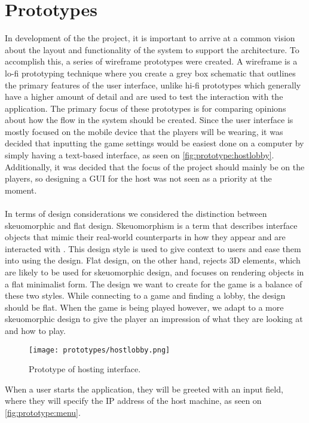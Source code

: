 \section{Prototypes}\label{sec:sprint1-prototypes}
In development of the the project, it is important to arrive at a common vision about the layout and functionality of the system to support the architecture.
To accomplish this, a series of wireframe prototypes were created.
A wireframe is a lo-fi prototyping technique where you create a grey box schematic that outlines the primary features of the user interface, unlike hi-fi prototypes which generally have a higher amount of detail and are used to test the interaction with the application.
The primary focus of these prototypes is for comparing opinions about how the flow in the system should be created.
Since the user interface is mostly focused on the mobile device that the players will be wearing, it was decided that inputting the game settings would be easiest done on a computer by simply having a text-based interface, as seen on \autoref{fig:prototype:hostlobby}.
Additionally, it was decided that the focus of the project should mainly be on the players, so designing a GUI for the host was not seen as a priority at the moment.
\\\\
In terms of design considerations we considered the distinction between skeuomorphic and flat design.
Skeuomorphism is a term that describes interface objects that mimic their real-world counterparts in how they appear and are interacted with \cite{skeuomorphism}.
This design style is used to give context to users and ease them into using the design.
Flat design, on the other hand, rejects 3D elements, which are likely to be used for skeuomorphic design, and focuses on rendering objects in a flat minimalist form.
The design we want to create for the game is a balance of these two styles.
While connecting to a game and finding a lobby, the design should be flat.
When the game is being played however, we adapt to a more skeuomorphic design to give the player an impression of what they are looking at and how to play.


\begin{figure}[H]
    \centering
    \texttt{[image: prototypes/hostlobby.png]}
    \caption{Prototype of hosting interface.}
    \label{fig:prototype:hostlobby}
\end{figure}
\noindent
When a user starts the application, they will be greeted with an input field, where they will specify the IP address of the host machine, as seen on \autoref{fig:prototype:menu}.


